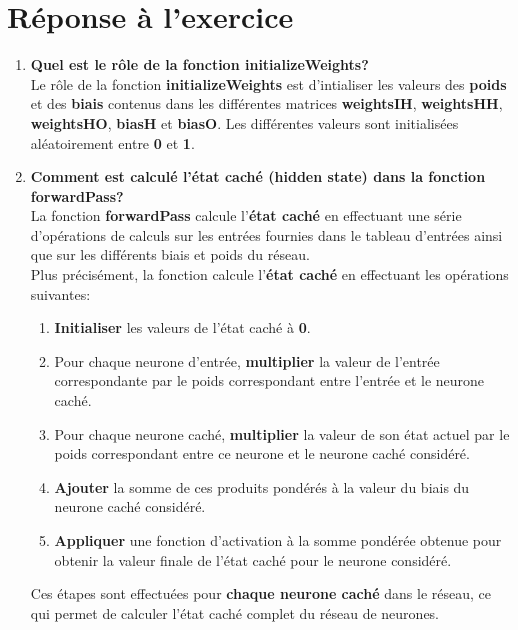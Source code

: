 \section{Réponse à l'exercice}
\begin{enumerate}
  \item {
    \textbf{Quel est le rôle de la fonction initializeWeights?} \vspace{0.2cm}\\
    Le rôle de la fonction \textbf{initializeWeights} est d'intialiser les valeurs des \textbf{poids} et des \textbf{biais} contenus 
    dans les différentes matrices \textbf{weightsIH}, \textbf{weightsHH}, \textbf{weightsHO}, \textbf{biasH} et \textbf{biasO}. 
    Les différentes valeurs sont initialisées aléatoirement entre \textbf{0} et \textbf{1}.
  } \\
  \item {
    \textbf{Comment est calculé l'état caché (hidden state) dans la fonction forwardPass?} \vspace{0.2cm}\\
    La fonction \textbf{forwardPass} calcule l'\textbf{état caché} en effectuant une série d'opérations de calculs sur les entrées fournies
    dans le tableau d'entrées ainsi que sur les différents biais et poids du réseau. \\
    Plus précisément, la fonction calcule l'\textbf{état caché} en effectuant les opérations suivantes:
    \begin{enumerate}
      \item \textbf{Initialiser} les valeurs de l'état caché à \textbf{0}.
      \item Pour chaque neurone d'entrée, \textbf{multiplier }la valeur de l'entrée correspondante par le poids correspondant entre l'entrée et le neurone caché.
      \item Pour chaque neurone caché, \textbf{multiplier} la valeur de son état actuel par le poids correspondant entre ce neurone et le neurone caché considéré.
      \item \textbf{Ajouter} la somme de ces produits pondérés à la valeur du biais du neurone caché considéré.
      \item \textbf{Appliquer} une fonction d'activation à la somme pondérée obtenue pour obtenir la valeur finale de l'état caché pour le neurone considéré.
    \end{enumerate}
    Ces étapes sont effectuées pour \textbf{chaque neurone caché} dans le réseau, ce qui permet de calculer l'état caché complet du réseau de neurones.
}
\end{enumerate}
